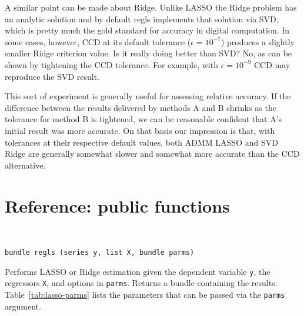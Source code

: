 \documentclass{article}
\newenvironment{funcdoc}
{\noindent\hrulefill\\[-12pt]}
{\medbreak}
\begin{document}
A similar point can be made about Ridge. Unlike LASSO the Ridge
problem has an analytic solution and by default \textsf{regls}
implements that solution via SVD, which is pretty much the gold
standard for accuracy in digital computation. In some cases, however,
CCD at its default tolerance ($\epsilon = 10^{-7}$) produces a
slightly smaller Ridge criterion value. Is it really doing better than
SVD? No, as can be shown by tightening the CCD tolerance. For example,
with $\epsilon = 10^{-9}$ CCD may reproduce the SVD result.

This sort of experiment is generally useful for assessing relative
accuracy. If the difference between the results delivered by methods A
and B shrinks as the tolerance for method B is tightened, we can be
reasonable confident that A's initial result was more accurate. On
that basis our impression is that, with tolerances at their respective
default values, both ADMM LASSO and SVD Ridge are generally somewhat
slower and somewhat more accurate than the CCD alternative.


\section{Reference: public functions}
\label{sec:funcref}

\begin{funcdoc}
\begin{verbatim}
bundle regls (series y, list X, bundle parms)
\end{verbatim}
  Performs LASSO or Ridge estimation given the dependent variable
  \texttt{y}, the regressors \texttt{X}, and options in
  \texttt{parms}. Returns a bundle containing the
  results. Table~\ref{tab:lasso-parms} lists the parameters that can
  be passed via the \texttt{parms} argument.
\end{funcdoc}
\end{document}
